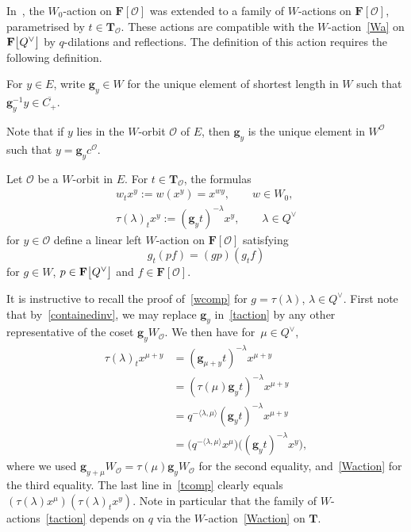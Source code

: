 In~\cite[Lemma 4.2]{SSV2}, the $W_0$-action on $\mathbf{F}[\mathcal{O}]$ was extended to a family of $W$-actions on $\mathbf{F}[\mathcal{O}]$, parametrised by
$t\in\mathbf{T}_\mathcal{O}$. These actions are compatible with the $W$-action~\eqref{Wa} on $\mathbf{F}\smash{\bigl[Q^\vee\bigr]}$ by $q$-dilations and reflections.
The definition of this action requires the following definition.

\begin{Definition}\label{gy}
For $y\in E$, write $\mathbf{g}_y\in W$ for the unique element of shortest length in $W$ such that $\mathbf{g}_y^{-1}y\in\overline{C_+}$.
\end{Definition}
Note that if $y$ lies in the $W$-orbit $\mathcal{O}$ of $E$,
then $\mathbf{g}_y$ is the unique element in $W^\mathcal{O}$ such that
$y=\mathbf{g}_yc^\mathcal{O}$.
\begin{Lemma}\label{tdefaction}
Let $\mathcal{O}$ be a $W$-orbit in $E$. For $t\in\mathbf{T}_\mathcal{O}$,
 the formulas
\begin{gather}
w_tx^y:=w(x^y)=x^{wy},\qquad w\in W_0, \nonumber\\
\tau(\lambda)_tx^y:=(\mathbf{g}_yt)^{-\lambda}x^y,\qquad \lambda\in Q^\vee\label{taction}
\end{gather}
for $y\in\mathcal{O}$ define a linear left $W$-action on $\mathbf{F}[\mathcal{O}]$
 satisfying
\begin{equation}\label{wcomp}
g_t(pf)=(gp)(g_tf)
\end{equation}
for $g\in W$, $p\in\mathbf{F}\smash{\bigl[Q^\vee\bigr]}$ and $f\in\mathbf{F}[\mathcal{O}]$.
\end{Lemma}
It is instructive to recall the proof of~\eqref{wcomp} for $g=\tau(\lambda)$, $\lambda\in Q^\vee$. First note that by~\eqref{containedinv},
we may replace $\mathbf{g}_y$ in~\eqref{taction} by any other representative of the coset $\mathbf{g}_yW_\mathcal{O}$.
We then have for~${\mu\in Q^\vee}$,
\begin{align}
\tau(\lambda)_tx^{\mu+y}&=(\mathbf{g}_{\mu+y}t)^{-\lambda}x^{\mu+y} \nonumber\\
&=(\tau(\mu)\mathbf{g}_yt)^{-\lambda}x^{\mu+y} \nonumber\\
&=q^{-\langle\lambda,\mu\rangle}(\mathbf{g}_y t)^{-\lambda}x^{\mu+y} \nonumber\\
&=\bigl(q^{-\langle\lambda,\mu\rangle}x^\mu\bigr)\bigl((\mathbf{g}_yt)^{-\lambda}x^y\bigr),\label{tcomp}
\end{align}
where we used $\mathbf{g}_{y+\mu}W_\mathcal{O}=\tau(\mu)\mathbf{g}_yW_\mathcal{O}$ for the second equality, and~\eqref{Waction} for the third equality.
The last line in~\eqref{tcomp} clearly equals $(\tau(\lambda)x^\mu)(\tau(\lambda)_tx^y)$. Note in particular that the family of $W$-actions~\eqref{taction} depends on $q$ via the $W$-action~\eqref{Waction} on $\mathbf{T}$.

